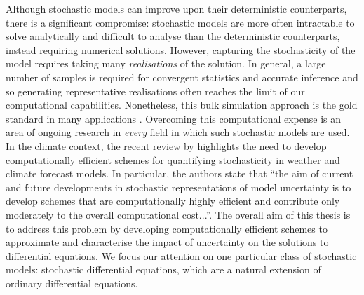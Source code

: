 Although stochastic models can improve upon their deterministic counterparts, there is a significant compromise: stochastic models are more often intractable to solve analytically and difficult to analyse than the deterministic counterparts, instead requiring numerical solutions.
However, capturing the stochasticity of the model requires taking many \emph{realisations} of the solution.
In general, a large number of samples is required for convergent statistics and accurate inference \citep{FepponLermusiaux_2018_DynamicallyOrthogonalNumerical,Leutbecher_2019_EnsembleSizeHow} and so generating representative realisations often reaches the limit of our computational capabilities.
Nonetheless, this bulk simulation approach is the gold standard in many applications \citep[e.g.]{Collins_2007_EnsemblesProbabilitiesNew,LeutbecherEtAl_2017_StochasticRepresentationsModel}.
Overcoming this computational expense is an area of ongoing research in \emph{every} field in which such stochastic models are used.
In the climate context, the recent review by \citet{LeutbecherEtAl_2017_StochasticRepresentationsModel} highlights the need to develop computationally efficient schemes for quantifying stochasticity in weather and climate forecast models.
In particular, the authors state that ``the aim of current and future developments in stochastic representations of model uncertainty is to develop schemes that are computationally highly efficient and contribute only moderately to the overall computational cost...''.
The overall aim of this thesis is to address this problem by developing computationally efficient schemes to approximate and characterise the impact of uncertainty on the solutions to differential equations.
We focus our attention on one particular class of stochastic models: stochastic differential equations, which are a natural extension of ordinary differential equations.


